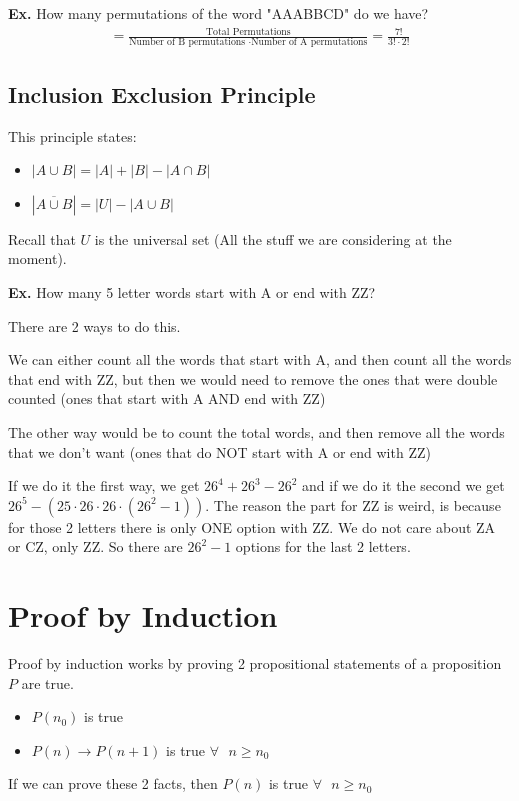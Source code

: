 \documentclass[12pt,letterpaper]{article} \usepackage{amsmath} \usepackage{graphicx}  \usepackage{longtable}  \usepackage{amssymb}
\begin{document}
        \begin{mdframed}
            \textbf{Ex. } How many permutations of the word "AAABBCD" do we have?
            \begin{align*}
                = \frac{\text{Total Permutations}}{\text{Number of B permutations }\cdot \text{Number of A permutations}} = \frac{7!}{3!\cdot2!}
            \end{align*}
        \end{mdframed}

        \subsection{Inclusion Exclusion Principle}
        This principle states:
        \begin{itemize}
            \item $|A\cup B| = |A| + |B| - |A\cap B|$
            \item $|\overline{A\cup B}|=|U| - |A\cup B|$
        \end{itemize}

        Recall that $U$ is the universal set (All the stuff we are considering at the moment).

        \begin{mdframed}
            \textbf{Ex. } How many 5 letter words start with A or end with ZZ?

            There are 2 ways to do this. 
            
            We can either count all the words that start with A, and then count all the words that end with ZZ, but then we would need to remove the ones that were double counted (ones that start with A AND end with ZZ)

            The other way would be to count the total words, and then remove all the words that we don't want (ones that do NOT start with A or end with ZZ)

            If we do it the first way, we get $26^4 + 26^3 - 26^2$ and if we do it the second we get $26^5 - (25\cdot26\cdot26\cdot(26^2-1))$. The reason the part for ZZ is weird, is because for those 2 letters there is only ONE option with ZZ. We do not care about ZA or CZ, only ZZ. So there are $26^2-1$ options for the last 2 letters.
        \end{mdframed}

    \section{Proof by Induction}
    Proof by induction works by proving 2 propositional statements of a proposition $P$ are true. 
    \begin{itemize}[noitemsep]
        \item $P(n_0)$ is true
        \item $P(n) \rightarrow P(n+1)$ is true $\forall \text{ } n\ge n_0$
    \end{itemize}
    If we can prove these 2 facts, then $P(n)$ is true $\forall \text{ } n\ge n_0$
\end{document}
